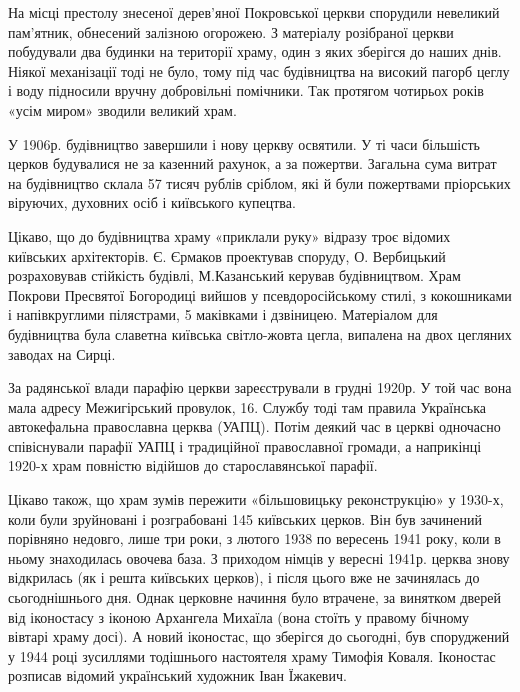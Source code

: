 На місці
престолу знесеної дерев’яної Покровської церкви спорудили невеликий
пам’ятник, обнесений залізною огорожею. З матеріалу розібраної церкви
побудували два будинки на території храму, один з яких зберігся до наших
днів. Ніякої механізації тоді не було, тому під час будівництва на високий
пагорб цеглу і воду підносили вручну добровільні помічники. Так протягом
чотирьох років «усім миром» зводили великий храм. 


У 1906р. будівництво завершили і нову церкву освятили. У ті часи більшість
церков будувалися не за казенний рахунок, а за пожертви. Загальна сума витрат
на будівництво склала 57 тисяч рублів сріблом, які й були пожертвами пріорських
віруючих, духовних осіб і київського купецтва. 

Цікаво, що до будівництва храму «приклали руку» відразу троє відомих київських
архітекторів. Є. Єрмаков проектував споруду, О. Вербицький розраховував
стійкість будівлі, М.Казанський керував будівництвом. Храм Покрови Пресвятої
Богородиці вийшов у псевдоросійському стилі, з кокошниками і напівкруглими
пілястрами, 5 маківками і дзвіницею. Матеріалом для будівництва була славетна
київська світло-жовта цегла, випалена на двох цегляних заводах на Сирці. 

За радянської влади парафію церкви зареєстрували в грудні 1920р. У той час вона
мала адресу Межигірський провулок, 16. Службу тоді там правила Українська
автокефальна православна церква (УАПЦ). Потім деякий час в церкві одночасно
співіснували парафії УАПЦ і традиційної православної громади, а наприкінці
1920-х храм повністю відійшов до старославянської парафії. 


Цікаво також, що храм зумів пережити «більшовицьку реконструкцію» у 1930-х,
коли були зруйновані і розграбовані 145 київських церков. Він був зачинений
порівняно недовго, лише три роки, з лютого 1938 по вересень 1941 року, коли в
ньому знаходилась овочева база. З приходом німців у вересні 1941р. церква знову
відкрилась (як і решта київських церков), і після цього вже не зачинялась до
сьогоднішнього дня. Однак церковне начиння було втрачене, за винятком дверей
від іконостасу з іконою Архангела Михаїла (вона стоїть у правому бічному
вівтарі храму досі). А новий іконостас, що зберігся до сьогодні, був
споруджений у 1944 році зусиллями тодішнього настоятеля храму Тимофія Коваля.
Іконостас розписав відомий український художник Іван Їжакевич.  

